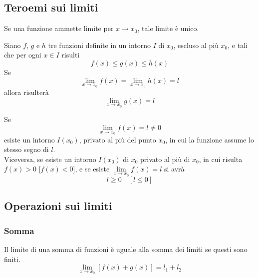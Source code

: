 \subsection{Teroemi sui limiti}
\begin{uniLim}\hypertarget{teor:uniLim}{}
  Se una funzione ammette limite per $x\to x_0$, tale limite è unico.
\end{uniLim}
\begin{confrontoLim}\hypertarget{teor:confLim}{}
  Siano $f$, $g$ e $h$ tre funzioni definite in un intorno $I$ di $x_0$, escluso al più $x_0$, e tali
  che per ogni $x\in I$ risulti
  \begin{equation*}
    f(x)\leq g(x)\leq h(x)
  \end{equation*}
  Se
  \begin{equation*}
    \lim\limits_{x\to x_0} f(x) = \lim\limits_{x\to x_0} h(x) = l
  \end{equation*}
  allora risulterà
  \begin{equation*}
    \lim\limits_{x\to x_0}g(x)=l
  \end{equation*}
\end{confrontoLim}
\begin{permanenzaSegno}\hypertarget{teor:segno}{}
  Se
  \begin{equation*}
    \lim\limits_{x\to x_0}f(x)=l\neq0
  \end{equation*}
  esiste un intorno $I(x_0)$, privato al più del punto $x_0$, in cui la funzione assume lo stesso 
  segno di $l$.\\
  Viceversa, se esiste un intorno $I(x_0)$ di $x_0$ privato al più di $x_0$, in cui risulta $f(x)>0$
  [$f(x)<0$], e se esiste $\lim\limits_{x\to x_0}f(x)=l$ si avrà
  \begin{equation*}
    l\geq0\quad[l\leq0]
  \end{equation*}
\end{permanenzaSegno}

\subsection{Operazioni sui limiti}
\subsubsection{Somma}
\begin{sommaLimiti}\hypertarget{teor:sommaLimiti}{}
  Il limite di una somma di funzioni è uguale alla somma dei limiti se questi sono finiti.
  \begin{equation*}
    \lim\limits_{x\to x_0}[f(x)+g(x)] = l_1+l_2
  \end{equation*}
\end{sommaLimiti}


